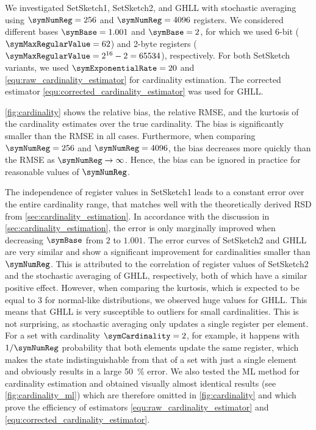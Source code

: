 \documentclass[sigconf, nonacm]{acmart}
\newif\ifextended\extendedtrue
\begin{document}
We investigated SetSketch1, SetSketch2, and \ac{GHLL} with stochastic averaging using $\symNumReg=256$ and $\symNumReg=4096$ registers. We considered different bases $\symBase=1.001$ and $\symBase=2$, for which we used 6-bit ($\symMaxRegularValue=62$) and 2-byte registers ($\symMaxRegularValue = 2^{16}-2 = 65534$), respectively. For both SetSketch variants, we used $\symExponentialRate=20$ and \eqref{equ:raw_cardinality_estimator} for cardinality estimation. The corrected estimator \eqref{equ:corrected_cardinality_estimator} was used for \ac{GHLL}. 

\cref{fig:cardinality} shows the relative bias, the relative \ac{RMSE}, and the kurtosis of the cardinality estimates over the true cardinality. The bias is significantly smaller than the \ac{RMSE} in all cases. Furthermore, when comparing $\symNumReg=256$ and $\symNumReg=4096$, the bias decreases more quickly than the \ac{RMSE} as $\symNumReg\rightarrow\infty$. Hence, the bias can be ignored in practice for reasonable values of $\symNumReg$.

The independence of register values in SetSketch1 leads to a constant error over the entire cardinality range, that matches well with the theoretically derived \ac{RSD} from \cref{sec:cardinality_estimation}. In accordance with the discussion in \cref{sec:cardinality_estimation}, the error is only marginally improved when decreasing $\symBase$ from $2$ to $1.001$. The error curves of SetSketch2 and \ac{GHLL} are very similar and show a significant improvement for cardinalities smaller than $\symNumReg$. 
This is attributed to the correlation of register values of SetSketch2 and the stochastic averaging of \ac{GHLL}, respectively, both of which have a similar positive effect. However, when comparing the kurtosis, which is expected to be equal to 3 for normal-like distributions, we observed huge values for \ac{GHLL}. This means that \ac{GHLL} is very susceptible to outliers for small cardinalities. This is not surprising, as stochastic averaging only updates a single register per element. For a set with cardinality $\symCardinality=2$, for example, it happens with $1/\symNumReg$ probability that both elements update the same register, which makes the state indistinguishable from that of a set with just a single element and obviously results in a large \SI{50}{\percent} error. We also tested the \ac{ML} method for cardinality estimation and obtained visually almost identical results \ifextended (see \cref{fig:cardinality_ml}) \else\cite{Ertl2021} \fi which are therefore omitted in \cref{fig:cardinality} and which prove the efficiency of estimators \eqref{equ:raw_cardinality_estimator} and \eqref{equ:corrected_cardinality_estimator}.
\end{document}
